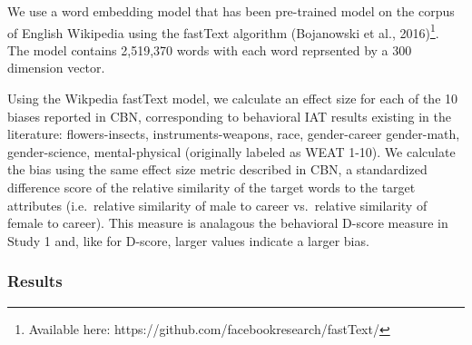 \documentclass[10pt, letterpaper]{article}
\begin{document}
We use a word embedding model that has been pre-trained model on the
corpus of English Wikipedia using the fastText algorithm (Bojanowski et
al.,
2016)\footnote{Available here: https://github.com/facebookresearch/fastText/}.
The model contains 2,519,370 words with each word reprsented by a 300
dimension vector.

Using the Wikpedia fastText model, we calculate an effect size for each
of the 10 biases reported in CBN, corresponding to behavioral IAT
results existing in the literature: flowers-insects,
instruments-weapons, race, gender-career gender-math, gender-science,
mental-physical (originally labeled as WEAT 1-10). We calculate the bias
using the same effect size metric described in CBN, a standardized
difference score of the relative similarity of the target words to the
target attributes (i.e.~relative similarity of male to career
vs.~relative similarity of female to career). This measure is analagous
the behavioral D-score measure in Study 1 and, like for D-score, larger
values indicate a larger bias.

\subsubsection{Results}\label{results-1}
\end{document}
